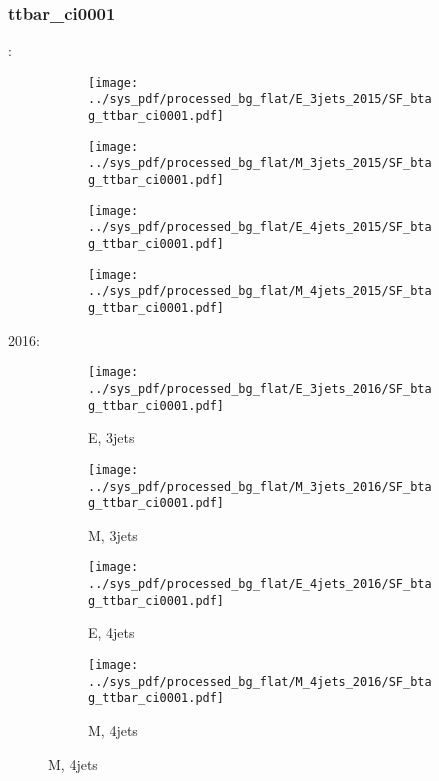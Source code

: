 \documentclass{beamer}
\begin{document}
\begin{frame}
\frametitle{ttbar_ci0001}
\fontsize{5}{1}:
\begin{figure}
\centering
\begin{subfigure}[b]{0.24\textwidth}
\texttt{[image: ../sys\_pdf/processed\_bg\_flat/E\_3jets\_2015/SF\_btag\_ttbar\_ci0001.pdf]}
\end{subfigure}
\begin{subfigure}[b]{0.24\textwidth}
\texttt{[image: ../sys\_pdf/processed\_bg\_flat/M\_3jets\_2015/SF\_btag\_ttbar\_ci0001.pdf]}
\end{subfigure}
\begin{subfigure}[b]{0.24\textwidth}
\texttt{[image: ../sys\_pdf/processed\_bg\_flat/E\_4jets\_2015/SF\_btag\_ttbar\_ci0001.pdf]}
\end{subfigure}
\begin{subfigure}[b]{0.24\textwidth}
\texttt{[image: ../sys\_pdf/processed\_bg\_flat/M\_4jets\_2015/SF\_btag\_ttbar\_ci0001.pdf]}
\end{subfigure}
\end{figure}
2016:
\begin{figure}
\centering
\begin{subfigure}[b]{0.24\textwidth}
\texttt{[image: ../sys\_pdf/processed\_bg\_flat/E\_3jets\_2016/SF\_btag\_ttbar\_ci0001.pdf]}
\captionsetup{font=tiny}
\caption{E, 3jets}
\end{subfigure}
\begin{subfigure}[b]{0.24\textwidth}
\texttt{[image: ../sys\_pdf/processed\_bg\_flat/M\_3jets\_2016/SF\_btag\_ttbar\_ci0001.pdf]}
\captionsetup{font=tiny}
\caption{M, 3jets}
\end{subfigure}
\begin{subfigure}[b]{0.24\textwidth}
\texttt{[image: ../sys\_pdf/processed\_bg\_flat/E\_4jets\_2016/SF\_btag\_ttbar\_ci0001.pdf]}
\captionsetup{font=tiny}
\caption{E, 4jets}
\end{subfigure}
\begin{subfigure}[b]{0.24\textwidth}
\texttt{[image: ../sys\_pdf/processed\_bg\_flat/M\_4jets\_2016/SF\_btag\_ttbar\_ci0001.pdf]}
\captionsetup{font=tiny}
\caption{M, 4jets}
\end{subfigure}
\end{figure}
\end{frame}
\end{document}
